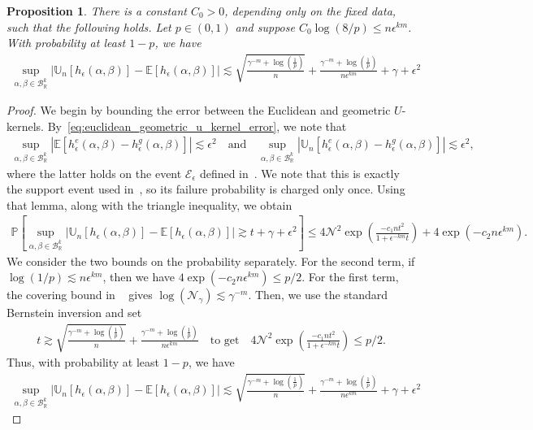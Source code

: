 \documentclass[11pt,reqno]{amsproc}
\numberwithin{equation}{section}
\newcommand{\R}{\mathbb{R}}
\newcommand{\E}{\mathbb{E}}
\newcommand{\U}{\mathbb{U}}
\newcommand{\PP}{\mathbb{P}}
\newcommand{\cN}{\mathcal{N}}
\newcommand{\cE}{\mathcal{E}}
\newcommand{\cB}{\mathcal{B}}
\newcommand{\ls}{\lesssim}
\newtheorem{proposition}[counter]{Proposition}
\newcommand{\andd}{\quad \text{and} \quad}
\theoremstyle{definition}
\theoremstyle{plain}
\begin{document}
    \begin{proposition} \label{prop:uniform_variance_euclidean}
        There is a constant $C_0>0$, depending only on the fixed data, such that the following holds. Let $p \in (0,1)$ and suppose $C_0\log(8/p) \leq n\epsilon^{km}$. With probability at least $1-p$, we have 
        \begin{align}
            \sup_{\alpha, \beta \in \cB_\R^k} \left| \U_n[h_\epsilon(\alpha, \beta)] - \E[h_\epsilon(\alpha, \beta)]\right| \ls  \sqrt{ \frac{\gamma^{-m} + \log(\frac{1}{p})}{n}} + \frac{\gamma^{-m} + \log(\frac{1}{p})}{n\epsilon^{km}} + \gamma + \epsilon^2
        \end{align}
    \end{proposition}
    \begin{proof}
        We begin by bounding the error between the Euclidean and geometric $U$-kernels. By~\eqref{eq:euclidean_geometric_u_kernel_error}, we note that
        \begin{align}
            \sup_{\alpha, \beta \in \cB_\R^k} |\E[h^e_\epsilon(\alpha, \beta)-h^g_\epsilon(\alpha, \beta)]| \ls \epsilon^2 \andd \sup_{\alpha, \beta \in \cB_\R^k} |\U_n[h^e_\epsilon(\alpha, \beta)-h^g_\epsilon(\alpha, \beta)]| \ls \epsilon^2,
        \end{align}
        where the latter holds on the event $\cE_\epsilon$ defined in~. We note that this is exactly the support event used in~, so its failure probability is charged only once. Using that lemma, along with the triangle inequality, we obtain
        \begin{align}
            \PP \left[ \sup_{\alpha, \beta \in \cB_\R^k} \left| \U_n[h_\epsilon(\alpha, \beta)] - \E[h_\epsilon(\alpha, \beta)]\right| \gtrsim t + \gamma + \epsilon^2 \right] \leq 4\cN^2 \exp\left(\frac{-c_1 n t^2}{1 +  \epsilon^{-km}t}\right) + 4\exp( - c_2n \epsilon^{km}).
        \end{align}
        We consider the two bounds on the probability separately. For the second term, if $\log(1/p) \ls n\epsilon^{km}$, then we have $4 \exp(-c_2 n \epsilon^{km}) \leq p/2$.
        For the first term, the covering bound in ~ gives $\log(\cN_\gamma) \ls \gamma^{-m}$. Then, we use the standard Bernstein inversion and set
        \begin{align}
        t \gtrsim  \sqrt{ \frac{\gamma^{-m} + \log(\frac{1}{p})}{n}} + \frac{\gamma^{-m} + \log(\frac{1}{p})}{n\epsilon^{km}} \quad \text{to get} \quad 4\cN^2 \exp\left(\frac{-c_1 n t^2}{1 +  \epsilon^{-km}t}\right) \leq p/2.
        \end{align}
        Thus, with probability at least $1 - p$, we have
        \begin{align}
            \sup_{\alpha, \beta \in \cB_\R^k} \left| \U_n[h_\epsilon(\alpha, \beta)] - \E[h_\epsilon(\alpha, \beta)]\right| \ls  \sqrt{ \frac{\gamma^{-m} + \log(\frac{1}{p})}{n}} + \frac{\gamma^{-m} + \log(\frac{1}{p})}{n\epsilon^{km}} + \gamma + \epsilon^2
        \end{align}
    \end{proof}
\end{document}
